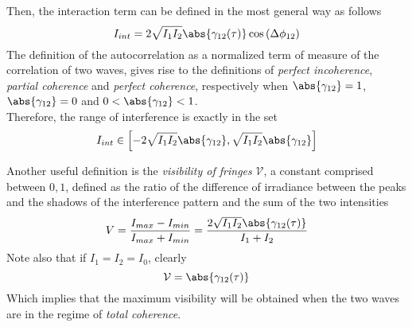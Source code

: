 \documentclass[../electromagnetism.tex]{subfiles}
\begin{document}
Then, the interaction term can be defined in the most general way as follows
\begin{equation}
	I_{int}=2\sqrt{I_1I_2}\abs{\gamma_{12}(\tau)}\cos\left( \Delta\phi_{12} \right)	
	\label{eq:intterm-autocorr.pcorr}
\end{equation}
The definition of the autocorrelation as a normalized term of measure of the correlation of two waves, gives rise to the definitions of \textit{perfect incoherence}, \textit{partial coherence} and \textit{perfect coherence}, respectively when $\abs{\gamma_{12}}=1$, $\abs{\gamma_{12}}=0$ and $0<\abs{\gamma_{12}}<1$.\\
Therefore, the range of interference is exactly in the set
\begin{equation}
	I_{int}\in\left[ -2\sqrt{I_1I_2}\abs{\gamma_{12}},\sqrt{I_1I_2}\abs{\gamma_{12}} \right]
	\label{eq:interfrange.pcorr}
\end{equation}
\begin{dfn}[Visibility]
	Another useful definition is the \textit{visibility of fringes} $\mathcal{V}$, a constant comprised between $0,1$, defined as the ratio of the difference of irradiance between the peaks and the shadows of the interference pattern and the sum of the two intensities
	\begin{equation}
		V=\frac{I_{max}-I_{min}}{I_{max}+I_{min}}=\frac{2\sqrt{I_1I_2}\abs{\gamma_{12}(\tau)}}{I_1+I_2}
		\label{eq:visibility.pcorr}
	\end{equation}
	Note also that if $I_1=I_2=I_0$, clearly
	\begin{equation*}
		\mathcal{V}=\abs{\gamma_{12}(\tau)}
	\end{equation*}
	Which implies that the maximum visibility will be obtained when the two waves are in the regime of \textit{total coherence}.
\end{dfn}
\end{document}
